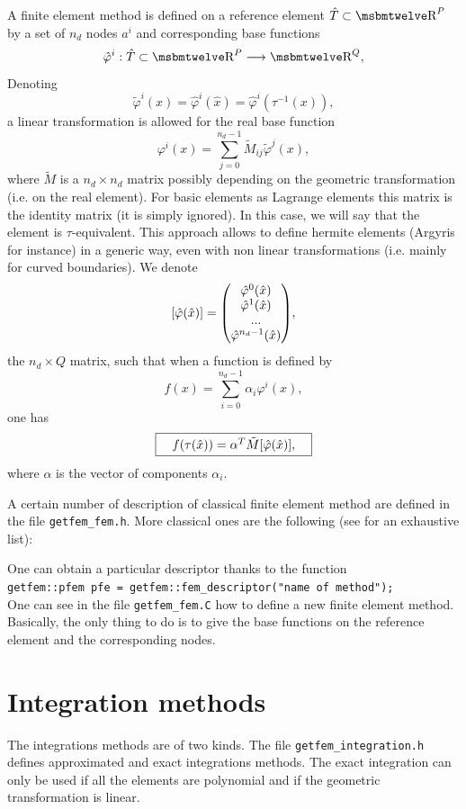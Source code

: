 \documentclass[11pt,a4paper]{article}
\begin{document}
A finite element method is defined on a reference element $\hat{T} \subset \Reel^P$ by a set of $n_d$ nodes $a^i$ and corresponding base functions 
$$ \hat{\varphi}^i : \hat{T} \subset \Reel^P \longrightarrow \Reel^Q, $$
Denoting
$$ \tilde{\varphi}^i(x) = \hat{\varphi}^i(\hat{x}) = \hat{\varphi}^i(\tau^{-1}(x)), $$
a linear transformation is allowed for the real base function
$$ \varphi^i(x) = \sum_{j = 0}^{n_d - 1} \tilde{M}_{ij} \tilde{\varphi}^j(x), $$
where $\tilde{M}$ is a $n_d \times n_d$ matrix possibly depending on the geometric transformation (i.e. on the real element). For basic elements as Lagrange elements this matrix is the identity matrix (it is simply ignored). In this case, we will say that the element is $\tau$-equivalent. This approach allows to define hermite elements (Argyris for instance) in a generic way, even with non linear transformations (i.e. mainly for curved boundaries).
We denote
$$ [\hat{\varphi}(\hat{x})] = {\left(\hspace{-.5em}\begin{array}{c} {\hat{\varphi}^0(\hat{x})} \\ {\hat{\varphi}^1(\hat{x})} \\ {...} \\ {\hat{\varphi}^{n_d-1}(\hat{x})} \end{array}\hspace{-.5em}\right)}, $$
the $n_d \times Q$ matrix, such that when a function is defined by
$$ f(x) = \sum_{i = 0}^{n_d - 1} \alpha_i \varphi^i(x), $$
one has
$$ \fbox{$\hspace{1em} f(\tau(\hat{x})) = \alpha^T \tilde{M} [\hat{\varphi}(\hat{x})],\hspace{1em}$} $$
where $\alpha$ is the vector of components $\alpha_i$.

A certain number of description of classical finite element method are defined in the file {\tt getfem\_fem.h}. More classical ones are the following (see \cite{FEM_LIST} for an exhaustive list):


One can obtain a particular descriptor thanks to the function\\[0.5cm]
{\tt getfem::pfem pfe = getfem::fem\_descriptor("name of method"); }\\[0.5cm]
One can see in the file {\tt getfem\_fem.C} how to define a new finite element method. Basically, the only thing to do is to give the base functions on the reference element and the corresponding nodes.

\section{Integration methods}

The integrations methods are of two kinds. The file {\tt getfem\_integration.h} defines approximated and exact integrations methods. The exact integration can only be used if all the elements are polynomial and if the geometric transformation is linear.
\end{document}
